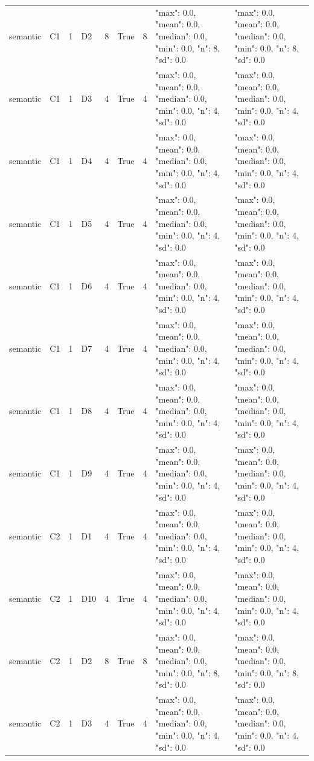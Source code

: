 \begin{tabular}{lllllllll}
semantic & C1 & 1 & D2 & 8 & True & 8 & {"max": 0.0, "mean": 0.0, "median": 0.0, "min": 0.0, "n": 8, "sd": 0.0} & {"max": 0.0, "mean": 0.0, "median": 0.0, "min": 0.0, "n": 8, "sd": 0.0} \\
semantic & C1 & 1 & D3 & 4 & True & 4 & {"max": 0.0, "mean": 0.0, "median": 0.0, "min": 0.0, "n": 4, "sd": 0.0} & {"max": 0.0, "mean": 0.0, "median": 0.0, "min": 0.0, "n": 4, "sd": 0.0} \\
semantic & C1 & 1 & D4 & 4 & True & 4 & {"max": 0.0, "mean": 0.0, "median": 0.0, "min": 0.0, "n": 4, "sd": 0.0} & {"max": 0.0, "mean": 0.0, "median": 0.0, "min": 0.0, "n": 4, "sd": 0.0} \\
semantic & C1 & 1 & D5 & 4 & True & 4 & {"max": 0.0, "mean": 0.0, "median": 0.0, "min": 0.0, "n": 4, "sd": 0.0} & {"max": 0.0, "mean": 0.0, "median": 0.0, "min": 0.0, "n": 4, "sd": 0.0} \\
semantic & C1 & 1 & D6 & 4 & True & 4 & {"max": 0.0, "mean": 0.0, "median": 0.0, "min": 0.0, "n": 4, "sd": 0.0} & {"max": 0.0, "mean": 0.0, "median": 0.0, "min": 0.0, "n": 4, "sd": 0.0} \\
semantic & C1 & 1 & D7 & 4 & True & 4 & {"max": 0.0, "mean": 0.0, "median": 0.0, "min": 0.0, "n": 4, "sd": 0.0} & {"max": 0.0, "mean": 0.0, "median": 0.0, "min": 0.0, "n": 4, "sd": 0.0} \\
semantic & C1 & 1 & D8 & 4 & True & 4 & {"max": 0.0, "mean": 0.0, "median": 0.0, "min": 0.0, "n": 4, "sd": 0.0} & {"max": 0.0, "mean": 0.0, "median": 0.0, "min": 0.0, "n": 4, "sd": 0.0} \\
semantic & C1 & 1 & D9 & 4 & True & 4 & {"max": 0.0, "mean": 0.0, "median": 0.0, "min": 0.0, "n": 4, "sd": 0.0} & {"max": 0.0, "mean": 0.0, "median": 0.0, "min": 0.0, "n": 4, "sd": 0.0} \\
semantic & C2 & 1 & D1 & 4 & True & 4 & {"max": 0.0, "mean": 0.0, "median": 0.0, "min": 0.0, "n": 4, "sd": 0.0} & {"max": 0.0, "mean": 0.0, "median": 0.0, "min": 0.0, "n": 4, "sd": 0.0} \\
semantic & C2 & 1 & D10 & 4 & True & 4 & {"max": 0.0, "mean": 0.0, "median": 0.0, "min": 0.0, "n": 4, "sd": 0.0} & {"max": 0.0, "mean": 0.0, "median": 0.0, "min": 0.0, "n": 4, "sd": 0.0} \\
semantic & C2 & 1 & D2 & 8 & True & 8 & {"max": 0.0, "mean": 0.0, "median": 0.0, "min": 0.0, "n": 8, "sd": 0.0} & {"max": 0.0, "mean": 0.0, "median": 0.0, "min": 0.0, "n": 8, "sd": 0.0} \\
semantic & C2 & 1 & D3 & 4 & True & 4 & {"max": 0.0, "mean": 0.0, "median": 0.0, "min": 0.0, "n": 4, "sd": 0.0} & {"max": 0.0, "mean": 0.0, "median": 0.0, "min": 0.0, "n": 4, "sd": 0.0} \\

\end{tabular}
